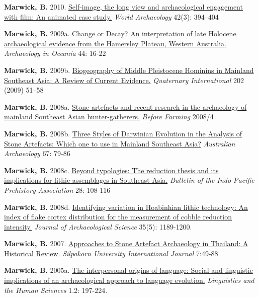 \documentclass[11pt,article,oneside]{memoir}
\begin{document}
\ind \textbf{Marwick, B.} 2010. \href{http://faculty.washington.edu/bmarwick/PDFs/Marwick_2010_WA_Wall-E.pdf}{Self-image, the long view and archaeological engagement with film: An animated case study.} \textit{World Archaeology} 42(3): 394–404

\ind \textbf{Marwick, B.} 2009a. \href{http://faculty.washington.edu/bmarwick/PDFs/Marwick_2009_AO_Pilbara.pdf}{Change or Decay? An interpretation of late Holocene archaeological evidence from the Hamersley Plateau, Western Australia.} \textit{Archaeology in Oceania} 44: 16-22

\ind \textbf{Marwick, B.}  2009b. \href{http://faculty.washington.edu/bmarwick/PDFs/Marwick_2009_QI.pdf}{Biogeography of Middle Pleistocene Hominins in Mainland Southeast Asia: A Review of Current Evidence.} \textit{Quaternary International} 202 (2009) 51–58

\ind \textbf{Marwick, B.} 2008a. \href{Marwick_2008_Before_Farming}{Stone artefacts and recent research in the archaeology of mainland Southeast Asian hunter-gatherers.} \textit{Before Farming} 2008/4

\ind \textbf{Marwick, B.} 2008b. \href{http://faculty.washington.edu/bmarwick/PDFs/Marwick_2008_AA_3_Styles.pdf}{Three Styles of Darwinian Evolution in the Analysis of Stone Artefacts: Which one to use in Mainland Southeast Asia?} \textit{Australian Archaeology} 67: 79-86

\ind \textbf{Marwick, B.} 2008c. \href{http://faculty.washington.edu/bmarwick/PDFs/Marwick_2008_BIPPA.pdf}{Beyond typologies: The reduction thesis and its implications for lithic assemblages in Southeast Asia.} \textit{Bulletin of the Indo-Pacific Prehistory Association} 28: 108-116

\ind \textbf{Marwick, B.} 2008d. \href{http://faculty.washington.edu/bmarwick/PDFs/Marwick_2008_JAS.pdf}{Identifying variation in Hoabinhian lithic technology: An index of flake cortex distribution for the measurement of cobble reduction intensity.} \textit{ Journal of Archaeological Science} 35(5): 1189-1200. 

\ind \textbf{Marwick, B.} 2007. \href{http://faculty.washington.edu/bmarwick/PDFs/Marwick_2007_SIJ.pdf}{Approaches to Stone Artefact Archaeology in Thailand: A Historical Review.} \textit{Silpakorn University International Journal} 7:49-88

\ind \textbf{Marwick, B.} 2005a. \href{http://faculty.washington.edu/bmarwick/PDFs/Marwick_2005_LHE.pdf}{The interpersonal origins of language: Social and linguistic implications of an archaeological approach to language evolution.} \textit{Linguistics and the Human Sciences} 1.2: 197-224.
\end{document}
